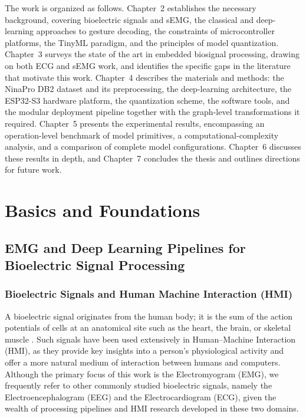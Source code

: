 \documentclass[12pt,DIV16,BCOR12mm,a4paper,footinclude=false,headinclude,parskip=half-,twoside,openright,cleardoublepage=empty,toc=index,bibliography=totoc,listof=totoc]{scrreprt}
\numberwithin{equation}{chapter}
\begin{document}
    The work is organized as follows. Chapter~2 establishes the
    necessary background, covering bioelectric signals and sEMG, the classical and
    deep-learning approaches to gesture decoding, the constraints of microcontroller
    platforms, the TinyML paradigm, and the principles of model quantization.
    Chapter~3 surveys the state of the art in embedded biosignal processing, drawing
    on both ECG and sEMG work, and identifies the specific gaps in the literature
    that motivate this work. Chapter~4 describes the materials and methods: the
    NinaPro DB2 dataset and its preprocessing, the deep-learning architecture, the
    ESP32-S3 hardware platform, the quantization scheme, the software tools, and the
    modular deployment pipeline together with the graph-level transformations it
    required. Chapter~5 presents the experimental results, encompassing an
    operation-level benchmark of model primitives, a computational-complexity
    analysis, and a comparison of complete model configurations. Chapter~6 discusses
    these results in depth, and Chapter~7 concludes the thesis and outlines
    directions for future work.

\chapter{Basics and Foundations}
  \section{EMG and Deep Learning Pipelines for Bioelectric Signal Processing}
    \subsection{Bioelectric Signals and Human Machine Interaction (HMI)}

    A bioelectric signal originates from the human body;
    it is the sum of the action potentials of cells at an anatomical site such as the
    heart, the brain, or skeletal muscle \cite{martinekAdvancedBioelectricalSignal2021}.
    Such signals have been used extensively in Human--Machine Interaction (HMI), as they
    provide key insights into a person's physiological activity and offer a more natural
    medium of interaction between humans and computers. Although the primary focus of this
    work is the Electromyogram (EMG), we frequently refer to other commonly studied
    bioelectric signals, namely the Electroencephalogram (EEG) and the Electrocardiogram
    (ECG), given the wealth of processing pipelines and HMI research developed in these two
    domains.
\end{document}
